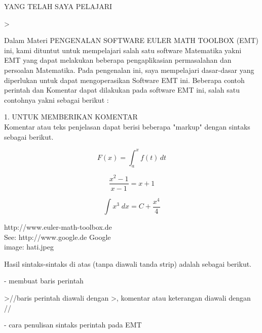 \documentclass[a4paper,10pt]{article}
\begin{document}
\begin{eulernotebook}
\begin{eulercomment}
\end{eulercomment}
\eulersubheading{}
\begin{eulercomment}
YANG TELAH SAYA PELAJARI
\end{eulercomment}
\begin{eulerprompt}
>  
\end{eulerprompt}
\begin{eulercomment}
Dalam Materi PENGENALAN SOFTWARE EULER MATH TOOLBOX (EMT) ini, kami
dituntut untuk mempelajari salah satu software Matematika yakni EMT
yang dapat melakukan beberapa pengaplikasian permasalahan dan
persoalan Matematika. Pada pengenalan ini, saya mempelajari
dasar-dasar yang diperlukan untuk dapat mengoperasikan Software EMT
ini. Beberapa contoh perintah dan Komentar dapat dilakukan pada
software EMT ini, salah satu contohnya yakni sebagai berikut :

1. UNTUK MEMBERIKAN KOMENTAR\\
Komentar atau teks penjelasan dapat berisi beberapa "markup" dengan
sintaks sebagai berikut.

\begin{eulercomment}
\begin{eulerformula}
\[
F (x) = \int_a^x f (t) \, dt
\]
\end{eulerformula}
\begin{eulerformula}
\[
\frac{x^2-1}{x-1} = x + 1
\]
\end{eulerformula}
\begin{eulerformula}
\[
\int {x^3}{\;dx}=C+\frac{x^4}{4}
\]
\end{eulerformula}
\begin{eulercomment}
http://www.euler-math-toolbox.de\\
See: http://www.google.de \textbar{} Google\\
image: hati.jpeg\\
\end{eulercomment}
\eulersubheading{}
\begin{eulercomment}
Hasil sintaks-sintaks di atas (tanpa diawali tanda strip) adalah
sebagai berikut.

- membuat baris perintah
\end{eulercomment}
\begin{eulerprompt}
>//baris perintah diawali dengan >, komentar atau keterangan diawali dengan //
\end{eulerprompt}
\begin{eulercomment}
- cara penulisan sintaks perintah pada EMT


\end{eulercomment}
\end{eulercomment}
\end{eulercomment}
\end{eulernotebook}
\end{document}
